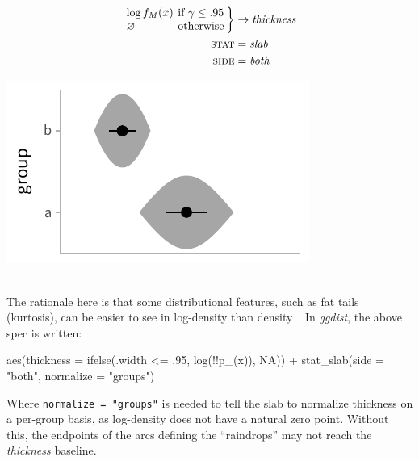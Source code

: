 \documentclass[journal]{vgtc}                     %
\newenvironment{centerverbatim}{%
\setlength{\parskip}{.4\belowdisplayskip}%
\vspace{.55\abovedisplayskip}%
\noindent%
\small%
\centering%
\varwidth{\linewidth}%
\verbatim
}{%
\endverbatim%
\endvarwidth%
\par%
\hfill\break%
}
\newcommand{\equationfigure}[2]{%
\noindent
\begin{minipage}{.5\columnwidth}
\setlength{\abovedisplayskip}{0pt} %
\setlength{\belowdisplayskip}{0pt} %
#1\end{minipage}%
\begin{minipage}{.4\columnwidth}\centering #2 \end{minipage}%
\vspace{.5\belowdisplayskip}\\
}
\begin{document}
\equationfigure{
\begin{align*}
\arraycolsep=2pt \left.\begin{array}{ll} \log f_M(x) & \textrm{if } \gamma \le .95\\ \varnothing & \textrm{otherwise}\end{array}\right\} &\rightarrow \textit{thickness}\\
\textsc{stat} &= \mathit{slab}\\
\textsc{side} &= \mathit{both}
\end{align*}
}{\includegraphics[width=1.2\columnwidth]{figs/3-slab_raindrop.pdf}}
The rationale here is that some distributional features, such as fat tails (kurtosis), can be easier to see in log-density than density~\cite{barrowman2003raindrop}. In \textit{ggdist}, the above spec is written:

\begin{centerverbatim}
aes(thickness = ifelse(.width <= .95, log(!!p_(x)), NA)) +
stat_slab(side = "both", normalize = "groups")
\end{centerverbatim}
Where \texttt{normalize = "groups"} is needed to tell the slab to normalize thickness on a per-group basis, as log-density does not have a natural zero point. Without this, the endpoints of the arcs defining the ``raindrops'' may not reach the \textit{thickness} baseline.
\end{document}
